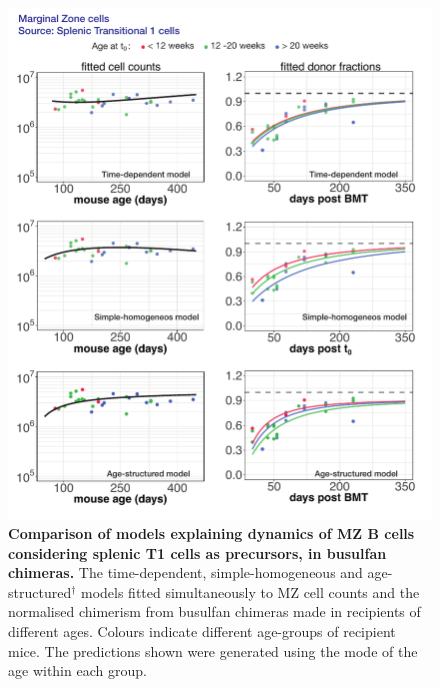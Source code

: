 \documentclass[11pt]{article}
\begin{document}
\begin{figure}[h!]
	\centerline{\includegraphics[scale = 1.1] {MZ_T1.pdf}}
	\caption{\small \textbf{Comparison of models  explaining dynamics of MZ B cells considering splenic T1 cells as precursors, in busulfan chimeras.} The time-dependent, simple-homogeneous and age-structured$^{\dagger}$ models fitted simultaneously to MZ cell counts and the normalised chimerism from busulfan chimeras made in recipients of different ages. Colours indicate different age-groups of recipient mice. The predictions shown were generated using the  mode of the age within each group.}
	\label{fig:MZ_T1}
\end{figure}
\end{document}
